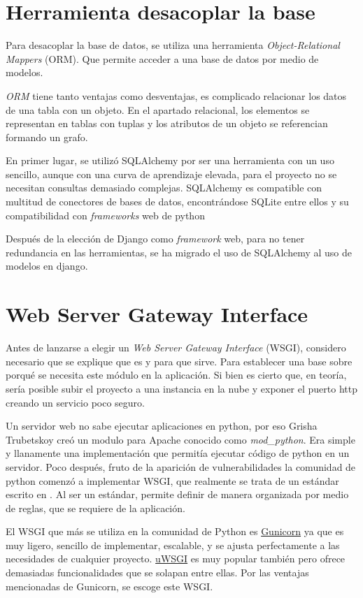 \section{Herramienta desacoplar la \gls{base}}
Para desacoplar la base de datos, se utiliza una herramienta \emph{Object-Relational Mappers} (ORM). Que permite acceder a una base de datos por medio de modelos. 

\emph{ORM} tiene tanto ventajas como desventajas, es complicado relacionar los datos de una tabla con un objeto. En el apartado relacional, los elementos se representan en tablas con tuplas y los atributos de un objeto se referencian formando un grafo. 

En primer lugar, se utilizó SQLAlchemy por ser una herramienta con un uso sencillo, aunque con una curva de aprendizaje elevada, para el proyecto no se necesitan consultas demasiado complejas. SQLAlchemy es compatible con multitud de conectores de bases de datos, encontrándose SQLite entre ellos y su compatibilidad con \emph{\glspl{framework}} web de \Gls{python} \cite{orm2023}

Después de la elección de Django como \emph{\gls{framework}} web, para no tener redundancia en las herramientas, se ha migrado el uso de SQLAlchemy al uso de modelos en \gls{django}. 

\section{Web Server Gateway Interface}
Antes de lanzarse a elegir un \emph{Web Server Gateway Interface} (\gls{WSGI}), considero necesario que se explique que es y para que sirve. Para establecer una base sobre porqué se necesita este módulo en la aplicación. Si bien es cierto que, en teoría, sería posible subir el proyecto a una instancia en la nube y exponer el puerto \gls{http} creando un servicio poco seguro.

Un servidor web no sabe ejecutar aplicaciones en python, por eso Grisha Trubetskoy creó un modulo para Apache conocido como \textit{mod\_python}. Era simple y llanamente una implementación que permitía ejecutar código de python en un servidor. Poco después, fruto de la aparición de vulnerabilidades la comunidad de python comenzó a implementar \gls{WSGI}, que realmente se trata de un estándar escrito en . Al ser un estándar, permite definir de manera organizada por medio de reglas, que se requiere de la aplicación. 

El \gls{WSGI} que más se utiliza en la comunidad de Python es \href{https://gunicorn.org/}{Gunicorn} ya que es muy ligero, sencillo de implementar, escalable, y se ajusta perfectamente a las necesidades de cualquier proyecto. \href{https://uwsgi-docs.readthedocs.io/en/latest/}{uWSGI} es muy popular también pero ofrece demasiadas funcionalidades que se solapan entre ellas. Por las ventajas mencionadas de Gunicorn, se escoge este \gls{WSGI}.

